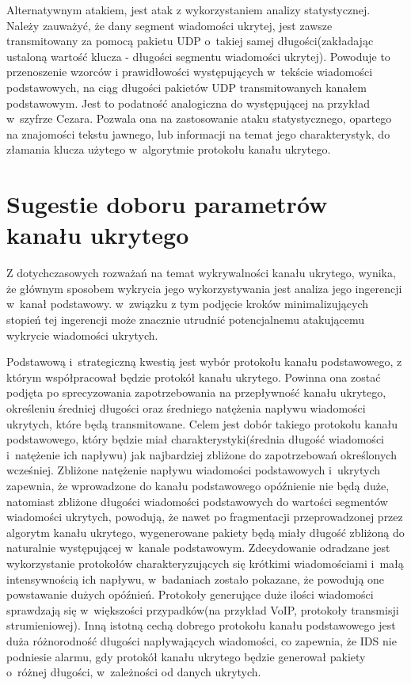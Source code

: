 \documentclass[a4paper, twoside, 12pt]{report}
\begin{document}
       Alternatywnym atakiem, jest atak z wykorzystaniem analizy statystycznej.
       Należy zauważyć, że dany segment wiadomości ukrytej, jest zawsze transmitowany
       za pomocą pakietu UDP o~takiej samej długości(zakładając ustaloną wartość klucza -
       długości segmentu wiadomości ukrytej). Powoduje to przenoszenie wzorców i
       prawidłowości występujących w~tekście wiadomości podstawowych, na ciąg długości
       pakietów UDP transmitowanych kanałem podstawowym. Jest to podatność analogiczna
       do występującej na przykład w~szyfrze Cezara. Pozwala ona na zastosowanie
       ataku statystycznego, opartego na znajomości tekstu jawnego, lub informacji
       na temat jego charakterystyk, do złamania klucza użytego w~algorytmie protokołu
       kanału ukrytego.

    \section{Sugestie doboru parametrów kanału ukrytego} \label{SUGESTIEPARAMETROW}
       Z dotychczasowych rozważań na temat wykrywalności kanału ukrytego, wynika,
       że głównym sposobem wykrycia jego wykorzystywania jest analiza jego ingerencji
       w~kanał podstawowy. w~związku z tym podjęcie kroków minimalizujących stopień
       tej ingerencji może znacznie utrudnić potencjalnemu atakującemu wykrycie
       wiadomości ukrytych.

       Podstawową i~strategiczną kwestią jest wybór protokołu kanału podstawowego,
       z którym współpracował będzie protokół kanału ukrytego. Powinna ona zostać
       podjęta po sprecyzowania zapotrzebowania na przepływność kanału ukrytego,
       określeniu średniej długości oraz średniego natężenia napływu wiadomości
       ukrytych, które będą transmitowane. Celem jest dobór takiego protokołu
       kanału podstawowego, który będzie miał charakterystyki(średnia długość wiadomości
       i~natężenie ich napływu) jak najbardziej zbliżone do zapotrzebowań określonych
       wcześniej. Zbliżone natężenie napływu wiadomości podstawowych i~ukrytych zapewnia,
       że wprowadzone do kanału podstawowego opóźnienie nie będą duże, natomiast
       zbliżone długości wiadomości podstawowych do wartości segmentów wiadomości ukrytych,
       powodują, że nawet po fragmentacji przeprowadzonej przez algorytm kanału ukrytego,
       wygenerowane pakiety będą miały długość zbliżoną do naturalnie występującej
       w~kanale podstawowym. Zdecydowanie odradzane jest wykorzystanie protokołów
       charakteryzujących się krótkimi wiadomościami i~małą intensywnością ich napływu,
       w~badaniach zostało pokazane, że powodują one powstawanie dużych opóźnień.
       Protokoły generujące duże ilości wiadomości sprawdzają się w~większości
       przypadków(na przykład VoIP, protokoły transmisji strumieniowej).
       Inną istotną cechą dobrego protokołu kanału podstawowego jest duża różnorodność
       długości napływających wiadomości, co zapewnia, że IDS nie podniesie alarmu,
       gdy protokół kanału ukrytego będzie generował pakiety o~różnej długości,
       w~zależności od danych ukrytych.
\end{document}
